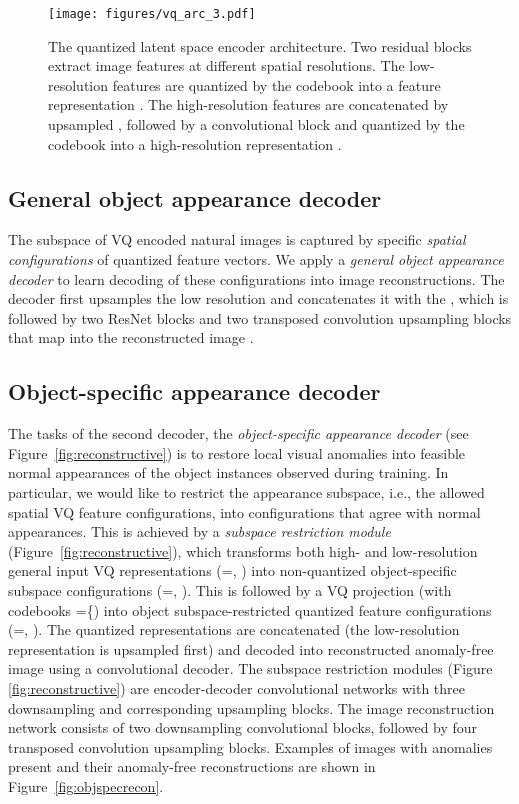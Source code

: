 \documentclass[runningheads]{llncs}
\begin{document}
\begin{figure}
\centering
  \texttt{[image: figures/vq\_arc\_3.pdf]}
\caption{The quantized latent space encoder architecture. Two residual blocks extract image features at different spatial resolutions. The low-resolution features  are quantized by the codebook  into a feature representation . The high-resolution features are concatenated by upsampled , followed by a convolutional block and quantized by the codebook  into a high-resolution representation  .}
\label{fig:latentenc}
\end{figure}


\subsection{General object appearance decoder} \label{sec:discreteDecoder}

The subspace of VQ encoded natural images is captured by specific \textit{spatial configurations} of quantized feature vectors. We apply a \textit{general object appearance decoder} to learn decoding of these configurations into image reconstructions. The decoder first upsamples the low resolution  and concatenates it with the , which is followed by two ResNet blocks and two transposed convolution upsampling blocks that map into the reconstructed image . 


\subsection{Object-specific appearance decoder} \label{sec:objectSpecific}

The tasks of the second decoder, the \textit{object-specific appearance decoder} (see Figure~\ref{fig:reconstructive}) is to restore local visual anomalies into feasible normal appearances of the object instances observed during training. In particular, we would like to restrict the appearance subspace, i.e., the allowed spatial VQ feature configurations, into configurations that agree with normal appearances. This is achieved by a \textit{subspace restriction module} (Figure~\ref{fig:reconstructive}), which transforms both high- and low-resolution general input VQ representations (=, ) into non-quantized object-specific subspace configurations (=, ). This is followed by a VQ projection (with codebooks =\{) into object subspace-restricted quantized feature configurations (=, ). The quantized representations are concatenated (the low-resolution representation is upsampled first) and decoded into reconstructed anomaly-free image  using a convolutional decoder. The subspace restriction modules (Figure \ref{fig:reconstructive}) are encoder-decoder convolutional networks with three downsampling and corresponding upsampling blocks. The image reconstruction network consists of two downsampling convolutional blocks, followed by four transposed convolution upsampling blocks.
Examples of images with anomalies present and their anomaly-free reconstructions are shown in Figure~\ref{fig:objspecrecon}.
\end{document}
